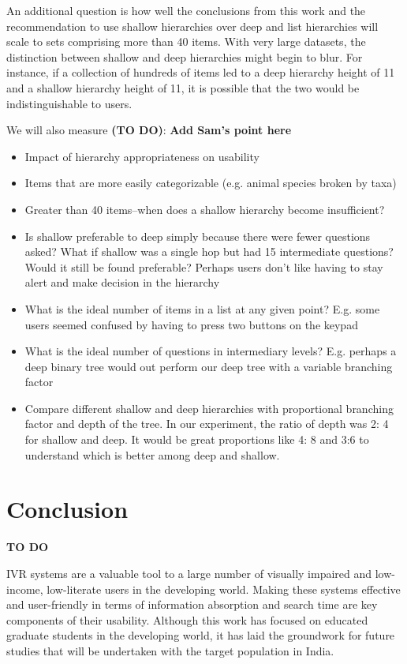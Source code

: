 \documentclass{sigchi}
\begin{document}
An additional question is how well the conclusions from this work and the recommendation to use shallow hierarchies over deep and list hierarchies will scale to sets comprising more than 40 items. With very large datasets, the distinction between shallow and deep hierarchies might begin to blur. For instance, if a collection of hundreds of items led to a deep hierarchy height of 11 and a shallow hierarchy height of 11, it is possible that the two would be indistinguishable to users.

We will also measure \textbf{(TO DO)}:  \textbf{Add Sam's point here}

\begin{itemize}
\item Impact of hierarchy appropriateness on usability
\item Items that are more easily categorizable (e.g. animal species broken by taxa)
\item Greater than 40 items--when does a shallow hierarchy become insufficient?
\item Is shallow preferable to deep simply because there were fewer questions asked? What if shallow was a single hop but had 15 intermediate questions? Would it still be found preferable? Perhaps users don't like having to stay alert and make decision in the hierarchy
\item What is the ideal number of items in a list at any given point? E.g. some users seemed confused by having to press two buttons on the keypad
\item What is the ideal number of questions in intermediary levels? E.g. perhaps a deep binary tree would out perform our deep tree with a variable branching factor
\item Compare different shallow and deep hierarchies with proportional branching factor and depth of the tree. In our experiment, the ratio of depth was 2: 4 for shallow and deep. It would be great proportions like 4: 8 and 3:6 to understand which is better among deep and shallow. 
\end{itemize}

\section{Conclusion}
\textbf{TO DO}

IVR systems are a valuable tool to a large number of visually impaired and low-income, low-literate users in the developing world. Making these systems effective and user-friendly in terms of information absorption and search time are key components of their usability. Although this work has focused on educated graduate students in the developing world, it has laid the groundwork for future studies that will be undertaken with the target population in India.
\end{document}
